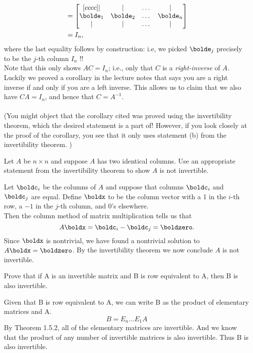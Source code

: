 \begin{solution}
\begin{align*}
&=\begin{bmatrix}[cccc]\vert&\vert &\dots &\vert\\ \bolde_1&\bolde_2&\dots&\bolde_n\\\vert&\vert &\dots &\vert \end{bmatrix}\\
&=I_n,
\end{align*}
where the last equality follows by construction: i.e, we picked $\bolde_j$ precisely to be the $j$-th column $I_n$ !!
\\
Note that this only shows $AC=I_n$; i.e., only that $C$ is a {\em right-inverse} of $A$. Luckily we proved a corollary in the lecture notes that says you are a right inverse if and only if you are a left inverse. This allows us to claim that we also have $CA=I_n$, and hence that $C=A^{-1}$.
\\ \\
(You might object that the corollary cited was proved using the invertibility theorem, which the desired statement is a part of! However, if you look closely at the proof of the corollary, you see that it only uses statement (b) from the invertibility theorem. )
\end{solution}
\ii Let $A$ be $n\times n$ and suppose $A$ has two identical columns. Use an appropriate statement from the invertibility theorem to show $A$ is not invertible.
\\
\begin{solution}
\noindent Let $\boldc_i$ be the columns of $A$ and suppose that columns $\boldc_i$ and $\boldc_j$ are equal. Define $\boldx$ to be the column vector with a 1 in the $i$-th row, a $-1$ in the $j$-th column, and 0's elsewhere. \\
Then the column method of matrix multiplication tells us that
\[
A\boldx=\boldc_i-\boldc_j=\boldzero.
\]
Since $\boldx$ is nontrivial, we have found a nontrivial solution to $A\boldx=\boldzero$. By the invertibility theorem we now conclude $A$ is not invertible.
\end{solution}

\ii Prove that if A is an invertible matrix and B is row equivalent to A, then B is also invertible.
\begin{solution}
Given that B is row equivalent to A, we can write B as the product of elementary matrices and A.\\
$$ B = E_n\dots E_1A$$
By Theorem 1.5.2, all of the elementary matrices are invertible. And we know that the product of any number of invertible matrices is also invertible. Thus B is also invertible.
\end{solution}


